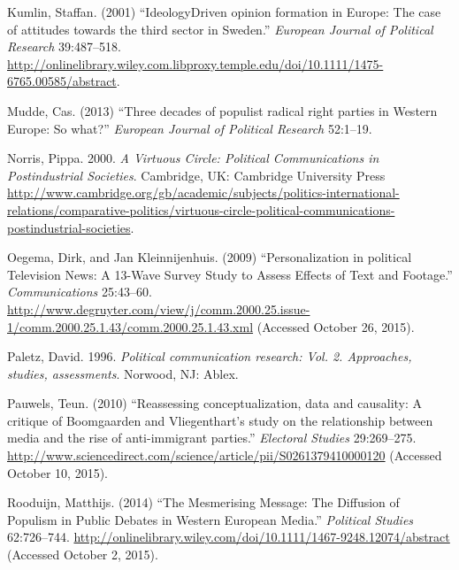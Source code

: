 \documentclass[12pt,article]{article}
\begin{document}
Kumlin, Staffan. (2001) ``IdeologyDriven opinion formation in Europe:
The case of attitudes towards the third sector in Sweden.''
\emph{European Journal of Political Research} 39:487--518.
\url{http://onlinelibrary.wiley.com.libproxy.temple.edu/doi/10.1111/1475-6765.00585/abstract}.

Mudde, Cas. (2013) ``Three decades of populist radical right parties in
Western Europe: So what?'' \emph{European Journal of Political Research}
52:1--19.

Norris, Pippa. 2000. \emph{A Virtuous Circle: Political Communications
in Postindustrial Societies}. Cambridge, UK: Cambridge University Press
\url{http://www.cambridge.org/gb/academic/subjects/politics-international-relations/comparative-politics/virtuous-circle-political-communications-postindustrial-societies}.

Oegema, Dirk, and Jan Kleinnijenhuis. (2009) ``Personalization in
political Television News: A 13-Wave Survey Study to Assess Effects of
Text and Footage.'' \emph{Communications} 25:43--60.
\url{http://www.degruyter.com/view/j/comm.2000.25.issue-1/comm.2000.25.1.43/comm.2000.25.1.43.xml}
(Accessed October 26, 2015).

Paletz, David. 1996. \emph{Political communication research: Vol. 2.
Approaches, studies, assessments}. Norwood, NJ: Ablex.

Pauwels, Teun. (2010) ``Reassessing conceptualization, data and
causality: A critique of Boomgaarden and Vliegenthart's study on the
relationship between media and the rise of anti-immigrant parties.''
\emph{Electoral Studies} 29:269--275.
\url{http://www.sciencedirect.com/science/article/pii/S0261379410000120}
(Accessed October 10, 2015).

Rooduijn, Matthijs. (2014) ``The Mesmerising Message: The Diffusion of
Populism in Public Debates in Western European Media.'' \emph{Political
Studies} 62:726--744.
\url{http://onlinelibrary.wiley.com/doi/10.1111/1467-9248.12074/abstract}
(Accessed October 2, 2015).
\end{document}
